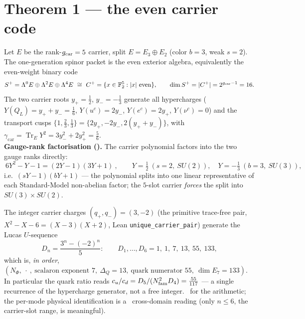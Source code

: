 \section*{Theorem 1 --- the even carrier code}
Let $E$ be the rank-$g_{\mathrm{car}}=5$ carrier, split $E=E_3\oplus E_2$ (color $b=3$, weak $s=2$). The
one-generation spinor packet is the even exterior algebra, equivalently the even-weight binary code
\begin{equation}
  S^+=\Lambda^0E\oplus\Lambda^2E\oplus\Lambda^4E\ \cong\ C^+=\{x\in\mathbb F_2^5:|x|\ \text{even}\},\qquad
  \dim S^+=|C^+|=2^{\gcar-1}=16 .
\end{equation}
The two carrier roots $y_+=\tfrac12$, $y_-=-\tfrac13$ generate all hypercharges
($Y(Q_L)=y_++y_-=\tfrac16$, $Y(u^c)=2y_-$, $Y(e^c)=2y_+$, $Y(\nu^c)=0$) and the transport cusps
$\{1,\tfrac23,\tfrac13\}=\{2y_+,-2y_-,2(y_++y_-)\}$, with $\gamma_{\mathrm{car}}=\operatorname{Tr}_EY^2=3y_-^2+2y_+^2=\tfrac56$. \mE
\smallskip\\
\noindent\textbf{Gauge-rank factorisation ().} The carrier polynomial factors
into the two gauge ranks directly:
\[
  \boxed{\ 6Y^2-Y-1=(2Y-1)(3Y+1)\ },\qquad Y=\tfrac12\ (s{=}2,\ SU(2)),\quad Y=-\tfrac13\ (b{=}3,\ SU(3)),
\]
i.e.\ $(sY-1)(bY+1)$ --- the polynomial splits into one linear representative of each Standard-Model
non-abelian factor; the $5$-slot carrier \emph{forces} the split into $SU(3)\times SU(2)$.

\begin{keybox}
The integer carrier charges $(q_+,q_-)=(3,-2)$ (the primitive trace-free pair, $X^2{-}X{-}6=(X{-}3)(X{+}2)$,
Lean \texttt{unique\_carrier\_pair}) generate the Lucas $U$-sequence
\[
  D_n=\frac{3^n-(-2)^n}{5}:\qquad D_1{,}\dots{,}D_6=1,\ 1,\ 7,\ 13,\ 55,\ 133,
\]
which is, \emph{in order}, $(N_\Phi,\ \cdot\ ,\ \text{scalaron exponent }7,\ \Delta_Q{=}13,\ \text{quark numerator }55,\ \dim E_7{=}133)$.
In particular the quark ratio reads $c_u/c_d=D_5/(N_{\mathrm{fam}}^2 D_4)=\tfrac{55}{117}$ --- a single recurrence of the
hypercharge generator, not a free integer. \mE\ for the arithmetic; the per-mode physical identification is a
\mC\ cross-domain reading (only $n\le6$, the carrier-slot range, is meaningful).
\end{keybox}

